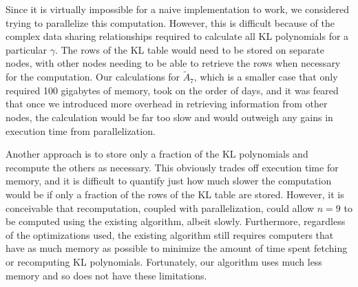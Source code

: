 \documentclass[12pt]{article} %
\begin{document}
Since it is virtually impossible for a naive implementation to work, we considered trying to parallelize this computation. However, this is difficult because of the complex data sharing relationships required to calculate all KL polynomials for a particular $\gamma$. The rows of the KL table would need to be stored on separate nodes, with other nodes needing to be able to retrieve the rows when necessary for the computation. Our calculations for $\tilde A_7$, which is a smaller case that only required 100 gigabytes of memory, took on the order of days, and it was feared that once we introduced more overhead in retrieving information from other nodes, the calculation would be far too slow and would outweigh any gains in execution time from parallelization.

Another approach is to store only a fraction of the KL polynomials and recompute the others as necessary. This obviously trades off execution time for memory, and it is difficult to quantify just how much slower the computation would be if only a fraction of the rows of the KL table are stored. However, it is conceivable that recomputation, coupled with parallelization, could allow $n=9$ to be computed using the existing algorithm, albeit slowly. Furthermore, regardless of the optimizations used, the existing algorithm still requires computers that have as much memory as possible to minimize the amount of time spent fetching or recomputing KL polynomials. Fortunately, our algorithm uses much less memory and so does not have these limitations.


\end{document}
